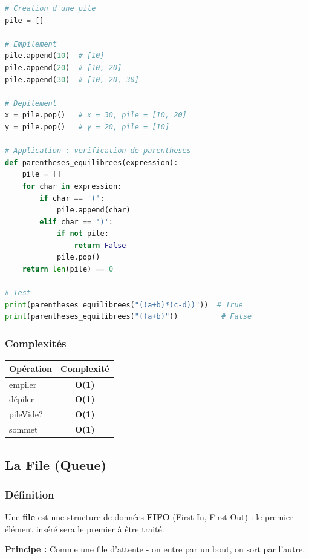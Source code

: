 \documentclass[12pt,a4paper]{article}
\begin{document}
\begin{exemple}
\begin{lstlisting}[language=Python]
# Creation d'une pile
pile = []

# Empilement
pile.append(10)  # [10]
pile.append(20)  # [10, 20]
pile.append(30)  # [10, 20, 30]

# Depilement
x = pile.pop()   # x = 30, pile = [10, 20]
y = pile.pop()   # y = 20, pile = [10]

# Application : verification de parentheses
def parentheses_equilibrees(expression):
    pile = []
    for char in expression:
        if char == '(':
            pile.append(char)
        elif char == ')':
            if not pile:
                return False
            pile.pop()
    return len(pile) == 0

# Test
print(parentheses_equilibrees("((a+b)*(c-d))"))  # True
print(parentheses_equilibrees("((a+b)"))          # False
\end{lstlisting}
\end{exemple}

\subsubsection{Complexités}

\begin{center}
\colorbox{fondbleu}{
\begin{tabular}{|l|c|}
\hline
\rowcolor{titrebleu!30}
\textbf{Opération} & \textbf{Complexité} \\
\hline
empiler & \textcolor{defvert}{\textbf{O(1)}} \\
dépiler & \textcolor{defvert}{\textbf{O(1)}} \\
pileVide? & \textcolor{defvert}{\textbf{O(1)}} \\
sommet & \textcolor{defvert}{\textbf{O(1)}} \\
\hline
\end{tabular}}
\end{center}

\newpage
\subsection{La File (Queue)}

\subsubsection{Définition}

\begin{definition}
Une \textbf{file} est une structure de données \textcolor{importantrouge}{\textbf{FIFO}} (First In, First Out) : le premier élément inséré sera le premier à être traité.

\textbf{Principe :} Comme une file d'attente - on entre par un bout, on sort par l'autre.
\end{definition}
\end{document}
